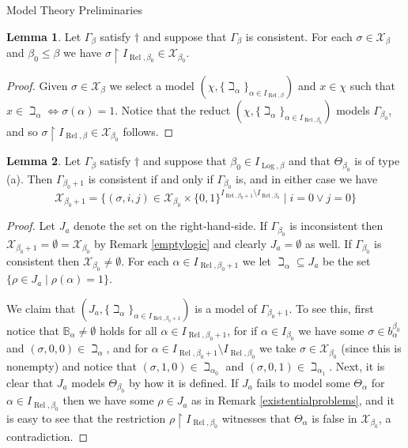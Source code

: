 \documentclass{amsart}
\theoremstyle{definition}\newtheorem{theorem}{Theorem}
\theoremstyle{definition}\newtheorem{bigtheorem}{Theorem}
\numberwithin{theorem}{section}
\theoremstyle{definition}\newtheorem{corollary}[theorem]{Corollary}
\theoremstyle{definition}\newtheorem{proposition}[theorem]{Proposition}
\theoremstyle{definition}\newtheorem{definition}[theorem]{Definition}
\theoremstyle{definition}\newtheorem{question}[theorem]{Question}
\theoremstyle{definition}\newtheorem{example}[theorem]{Example}
\theoremstyle{definition}\newtheorem{remark}[theorem]{Remark}
\theoremstyle{definition}\newtheorem{note}[theorem]{Note}
\theoremstyle{definition}\newtheorem{lemma}[theorem]{Lemma}
\theoremstyle{definition}\newtheorem{fact}[theorem]{Fact}
\theoremstyle{definition}\newtheorem{define}[theorem]{Definition}
\theoremstyle{definition}\newtheorem{definitions}[theorem]{Definitions}
\theoremstyle{definition}\newtheorem{claim}[theorem]{Claim}
\theoremstyle{definition}\newtheorem{obs}[theorem]{Observation}
\theoremstyle{definition}\newtheorem{construction}[theorem]{Construction}
\newcommand{\B}{\mathbb{B}}
\newcommand{\Rel}{\operatorname{Rel}}
\newcommand{\Log}{\operatorname{Log}}
\newcommand{\X}{\mathcal{X}}
\begin{document}
\begin{section}{Model Theory Preliminaries}
\begin{lemma}\label{cutoff}  Let $\Gamma_{\beta}$ satisfy $\dagger$ and suppose that $\Gamma_{\beta}$ is consistent.  For each $\sigma \in \X_{\beta}$ and $\beta_0 \leq \beta$ we have $\sigma\upharpoonright I_{\Rel, \beta_0} \in \X_{\beta_0}$.
\end{lemma}

\begin{proof}  Given $\sigma \in \X_{\beta}$ we select a model $(\chi, \{\beth_{\alpha}\}_{\alpha \in I_{\Rel, \beta}})$ and $x\in \chi$ such that $x\in \beth_{\alpha} \Leftrightarrow \sigma(\alpha) = 1$.  Notice that the reduct $(\chi, \{\beth_{\alpha}\}_{\alpha \in I_{\Rel, \beta_0}})$ models $\Gamma_{\beta_0}$, and so $\sigma\upharpoonright I_{\Rel, \beta} \in \X_{\beta_0}$ follows.
\end{proof}

\begin{lemma}\label{nextstagea}  Let $\Gamma_{\beta}$ satisfy $\dagger$ and suppose that $\beta_0 \in I_{\Log, \beta}$ and that $\Theta_{\beta_0}$ is of type (a).  Then $\Gamma_{\beta_0 + 1}$ is consistent if and only if $\Gamma_{\beta_0}$ is, and in either case we have $$\X_{\beta_0 + 1} = \{(\sigma, i, j) \in \X_{\beta_0} \times \{0, 1\}^{I_{\Rel, \beta_0 + 1} \setminus I_{\Rel, \beta_0}}\mid i = 0 \vee j = 0\}$$
\end{lemma}

\begin{proof}  Let $J_a$ denote the set on the right-hand-side.  If $\Gamma_{\beta_0}$ is inconsistent then $\X_{\beta_0 + 1} = \emptyset = \X_{\beta_0}$ by Remark \ref{emptylogic} and clearly $J_a = \emptyset$ as well.  If $\Gamma_{\beta_0}$ is consistent then $\X_{\beta_0} \neq \emptyset$.  For each $\alpha \in I_{\Rel, \beta_0 + 1}$ we let $\beth_{\alpha} \subseteq J_a$ be the set $\{\rho \in J_a \mid \rho(\alpha) = 1\}$.

We claim that $(J_a, \{\beth_{\alpha}\}_{\alpha \in I_{\Rel, \beta_0 + 1}})$ is a model of $\Gamma_{\beta_0 + 1}$.  To see this, first notice that $\B_{\alpha} \neq \emptyset$ holds for all $\alpha \in I_{\Rel, \beta_0 + 1}$, for if $\alpha \in I_{\beta_0}$ we have some $\sigma \in b_{\alpha}^{\beta_0}$ and $(\sigma, 0, 0) \in \beth_{\alpha}$, and for $\alpha \in I_{\Rel, \beta_0 + 1} \setminus I_{\Rel, \beta_0}$ we take $\sigma \in \X_{\beta_0}$ (since this is nonempty) and notice that $(\sigma, 1, 0) \in \beth_{\alpha_0}$ and $(\sigma, 0, 1) \in \beth_{\alpha_1}$.  Next, it is clear that $J_a$ models $\Theta_{\beta_0}$ by how it is defined.  If $J_a$ fails to model some $\Theta_{\alpha}$ for $\alpha \in I_{\Rel, \beta_0}$ then we have some $\rho \in J_a$ as in Remark \ref{existentialproblems}, and it is easy to see that the restriction $\rho \upharpoonright I_{\Rel, \beta_0}$ witnesses that $\Theta_{\alpha}$ is false in $\X_{\beta_0}$, a contradiction.


\end{proof}
\end{section}
\end{document}
